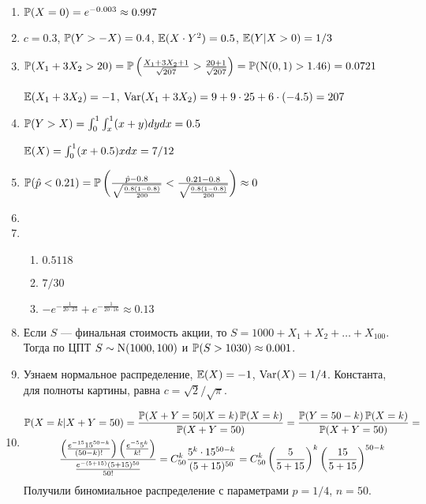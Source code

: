 \begin{enumerate}
\item $\P(X=0) = e^{-0.003} \approx 0.997$
\item $c=0.3$, $\P(Y > -X) = 0.4$, $\E(X\cdot Y^2) = 0.5$, $\E(Y|X>0) = 1/3$
\item $\P(X_1 +3X_2 > 20) = \P\left(\frac{X_1 +3X_2 +1}{\sqrt{207}}  > \frac{20+1}{\sqrt{207}}\right) = \P(\cN(0,1) > 1.46) = 0.0721$

$\E(X_1 +3X_2) = -1$, $\Var(X_1 +3X_2) = 9 + 9\cdot 25 +6 \cdot(-4.5) = 207$
\item $\P(Y > X) = \int_0^1 \int_x^1 (x+y) dy dx = 0.5$

$\E(X) = \int_0^1 (x+0.5)x dx = 7/12$


\item $\P(\hat{p} < 0.21) = \P\left(\frac{\hat{p} - 0.8}{\sqrt{\frac{0.8(1-0.8)}{200}}} < \frac{0.21 - 0.8}{\sqrt{\frac{0.8(1-0.8)}{200}}} \right) \approx 0$ %
\item
\item
\begin{enumerate}
\item $0.5118$
\item $7/30$
\item $-e^{-\frac{1}{20\cdot 23}} + e^{-\frac{1}{20\cdot 16}} \approx 0.13$
\end{enumerate}
\item Если $S$ — финальная стоимость акции, то $S=1000+X_1+X_2+\ldots+X_{100}$. 
Тогда по ЦПТ $S\sim \cN(1000,100)$ и $\P(S>1030)\approx 0.001$.
\item Узнаем нормальное распределение, $\E(X) = -1$, $\Var(X) = 1/4$. Константа, для полноты картины, равна $c=\sqrt{2}/\sqrt{\pi}$.
\item
\begin{multline*}
\P(X=k|X+Y=50) = \frac{\P(X+Y =50 | X=k)\P(X=k)}{\P(X+Y=50)} = \frac{\P(Y=50-k)\P(X=k)}{\P(X+Y=50)} = \\
\frac{\left(\frac{e^{-15} 15^{50-k}}{(50-k)!}\right) \left(\frac{e^{-5} 5^k}{k!}\right)}{\frac{e^{-(5+15)}(5+15)^{50}}{50!}} = C_{50}^k \frac{5^k \cdot 15^{50-k}}{(5+15)^{50}} = C_{50}^k \left(\frac{5}{5+15}\right)^k \left(\frac{15}{5+15}\right)^{50-k}
\end{multline*}
Получили биномиальное распределение с параметрами $p=1/4$, $n=50$.
\end{enumerate}



